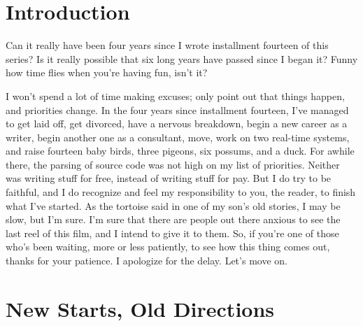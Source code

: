 \documentclass[float=false, crop=false]{standalone}
\begin{document}
\section{Introduction}

Can it really have been four years since I wrote installment fourteen of this
series? Is it really possible that six long years have passed since I began it?
Funny how time flies when you're having fun, isn't it?

I won't spend a lot of time making excuses; only point out that things happen,
and priorities change. In the four years since installment fourteen, I've
managed to get laid off, get divorced, have a nervous breakdown, begin a new
career as a writer, begin another one as a consultant, move, work on two
real-time systems, and raise fourteen baby birds, three pigeons, six possums,
and a duck. For awhile there, the parsing of source code was not high on my list
of priorities. Neither was writing stuff for free, instead of writing stuff for
pay. But I do try to be faithful, and I do recognize and feel my responsibility
to you, the reader, to finish what I've started. As the tortoise said in one of
my son's old stories, I may be slow, but I'm sure. I'm sure that there are
people out there anxious to see the last reel of this film, and I intend to give
it to them. So, if you're one of those who's been waiting, more or less
patiently, to see how this thing comes out, thanks for your patience. I
apologize for the delay. Let's move on.


\section{New Starts, Old Directions}
\end{document}
